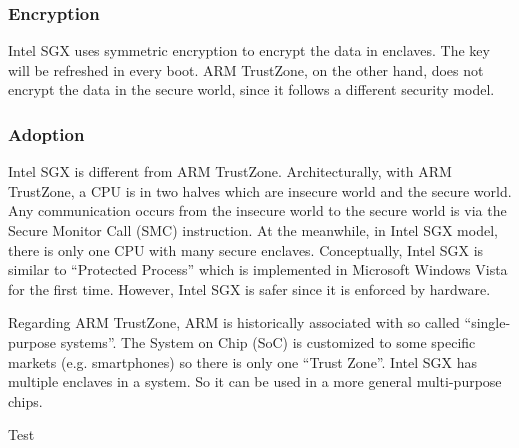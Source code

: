 \subsubsection{Encryption}
Intel SGX uses symmetric encryption to encrypt the data in 
enclaves. The key will be refreshed in every boot. ARM TrustZone,
on the other hand, does not encrypt the data in the secure world,
since it follows a different security model.      



\subsubsection{Adoption}





Intel SGX is different from ARM TrustZone. Architecturally, with ARM TrustZone, a
CPU is in two halves which are insecure world and the secure world. Any 
communication occurs from the insecure world to the secure world is via the 
Secure Monitor Call (SMC) instruction. At the meanwhile, in Intel SGX model,
there is only one CPU with many secure enclaves. Conceptually, Intel SGX
is similar to ``Protected Process'' which is implemented in Microsoft Windows
Vista for the first time. However, Intel SGX is safer since it is enforced 
by hardware. 

Regarding ARM TrustZone, ARM is historically associated with so called ``single-
purpose systems''. The System on Chip (SoC) is customized to some specific markets
(e.g. smartphones) so there is only one ``Trust Zone''. Intel SGX has multiple 
enclaves in a system. So it can be used in a more general multi-purpose chips.     

Test~\cite{ChurchEncoding}
